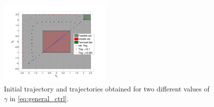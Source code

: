\begin{figure}[t]
\centering
\includegraphics[width=0.49\textwidth]{figures/ToyExampleControl}
\caption{Initial trajectory and trajectories obtained for two different values of $\gamma$ in \eqref{eq:general_ctrl}.}
\label{fig:toy control}
\end{figure}